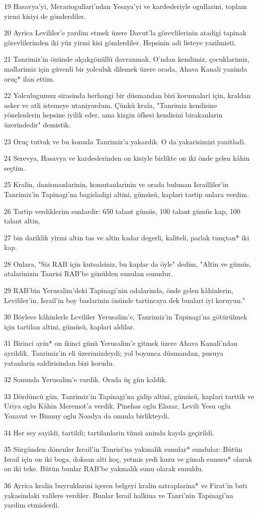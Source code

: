 \par 19 Hasavya'yi, Merariogullari'ndan Yesaya'yi ve kardesleriyle ogullarini, toplam yirmi kisiyi de gönderdiler.
\par 20 Ayrica Levililer'e yardim etmek üzere Davut'la görevlilerinin atadigi tapinak görevlilerinden iki yüz yirmi kisi gönderdiler. Hepsinin adi listeye yazilmisti.
\par 21 Tanrimiz'in önünde alçakgönüllü davranmak, O'ndan kendimiz, çocuklarimiz, mallarimiz için güvenli bir yolculuk dilemek üzere orada, Ahava Kanali yaninda oruç* ilan ettim.
\par 22 Yolculugumuz sirasinda herhangi bir düsmandan bizi korumalari için, kraldan asker ve atli istemeye utaniyordum. Çünkü krala, "Tanrimiz kendisine yönelenlerin hepsine iyilik eder, ama kizgin öfkesi kendisini birakanlarin üzerindedir" demistik.
\par 23 Oruç tuttuk ve bu konuda Tanrimiz'a yakardik. O da yakarisimizi yanitladi.
\par 24 Serevya, Hasavya ve kardeslerinden on kisiyle birlikte on iki önde gelen kâhin seçtim.
\par 25 Kralin, danismanlarinin, komutanlarinin ve orada bulunan Israilliler'in Tanrimiz'in Tapinagi'na bagisladigi altini, gümüsü, kaplari tartip onlara verdim.
\par 26 Tartip verdiklerim sunlardir: 650 talant gümüs, 100 talant gümüs kap, 100 talant altin,
\par 27 bin dariklik yirmi altin tas ve altin kadar degerli, kaliteli, parlak tunçtan* iki kap.
\par 28 Onlara, "Siz RAB için kutsalsiniz, bu kaplar da öyle" dedim, "Altin ve gümüs, atalarinizin Tanrisi RAB'be gönülden sunulan sunudur.
\par 29 RAB'bin Yerusalim'deki Tapinagi'nin odalarinda, önde gelen kâhinlerin, Levililer'in, Israil'in boy baslarinin önünde tartincaya dek bunlari iyi koruyun."
\par 30 Böylece kâhinlerle Levililer Yerusalim'e, Tanrimiz'in Tapinagi'na götürülmek için tartilan altini, gümüsü, kaplari aldilar.
\par 31 Birinci ayin* on ikinci günü Yerusalim'e gitmek üzere Ahava Kanali'ndan ayrildik. Tanrimiz'in eli üzerimizdeydi; yol boyunca düsmandan, pusuya yatanlarin saldirisindan bizi korudu.
\par 32 Sonunda Yerusalim'e vardik. Orada üç gün kaldik.
\par 33 Dördüncü gün, Tanrimiz'in Tapinagi'na gidip altini, gümüsü, kaplari tarttik ve Uriya oglu Kâhin Meremot'a verdik. Pinehas oglu Elazar, Levili Yesu oglu Yozavat ve Binnuy oglu Noadya da onunla birlikteydi.
\par 34 Her sey sayildi, tartildi; tartilanlarin tümü aninda kayda geçirildi.
\par 35 Sürgünden dönenler Israil'in Tanrisi'na yakmalik sunular* sundular: Bütün Israil için on iki boga, doksan alti koç, yetmis yedi kuzu ve günah sunusu* olarak on iki teke. Bütün bunlar RAB'be yakmalik sunu olarak sunuldu.
\par 36 Ayrica kralin buyruklarini içeren belgeyi kralin satraplarina* ve Firat'in bati yakasindaki valilere verdiler. Bunlar Israil halkina ve Tanri'nin Tapinagi'na yardim etmislerdi.

